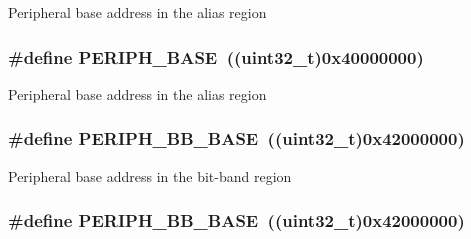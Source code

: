 Peripheral base address in the alias region \hypertarget{group___peripheral__memory__map_ga9171f49478fa86d932f89e78e73b88b0}{
\subsubsection[{P\-E\-R\-I\-P\-H\-\_\-\-B\-A\-S\-E}]{\setlength{\rightskip}{0pt plus 5cm}\#define P\-E\-R\-I\-P\-H\-\_\-\-B\-A\-S\-E~((uint32\-\_\-t)0x40000000)}}\label{group___peripheral__memory__map_ga9171f49478fa86d932f89e78e73b88b0}
Peripheral base address in the alias region \hypertarget{group___peripheral__memory__map_gaed7efc100877000845c236ccdc9e144a}{
\subsubsection[{P\-E\-R\-I\-P\-H\-\_\-\-B\-B\-\_\-\-B\-A\-S\-E}]{\setlength{\rightskip}{0pt plus 5cm}\#define P\-E\-R\-I\-P\-H\-\_\-\-B\-B\-\_\-\-B\-A\-S\-E~((uint32\-\_\-t)0x42000000)}}\label{group___peripheral__memory__map_gaed7efc100877000845c236ccdc9e144a}
Peripheral base address in the bit-\/band region \hypertarget{group___peripheral__memory__map_gaed7efc100877000845c236ccdc9e144a}{
\subsubsection[{P\-E\-R\-I\-P\-H\-\_\-\-B\-B\-\_\-\-B\-A\-S\-E}]{\setlength{\rightskip}{0pt plus 5cm}\#define P\-E\-R\-I\-P\-H\-\_\-\-B\-B\-\_\-\-B\-A\-S\-E~((uint32\-\_\-t)0x42000000)}}\label{group___peripheral__memory__map_gaed7efc100877000845c236ccdc9e144a}

